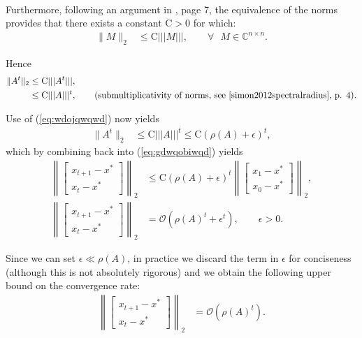 \documentclass{article}
\begin{document}
\\
\par Furthermore, following an argument in \cite{simon2012spectralradius}, page 7, the equivalence of the norms provides that there exists a constant $\text{C}>0$ for which:
\begin{align}
	\| M \|_2 &\le \text{C} ||| M |||, \qquad \forall \text{ }M \in \mathds{C}^{n\times n}. \nonumber
\end{align}
\par Hence
\begin{align}
	\| A^t \|_2	&\le \text{C} ||| A^t |||, \nonumber \\
			&\le \text{C} ||| A |||^t, \qquad \text{(submultiplicativity of norms, see \cite{simon2012spectralradius}, p. 4)}.\nonumber
\end{align}
\par Use of (\ref{eq:wdojqwqwd}) now yields
\begin{align}
	\label{eq:pefnponweffe}
	\| A^t \|_2 &\le \text{C} ||| A |||^t \le \text{C} \left( \rho\left(A\right) + \epsilon \right)^t, \nonumber
\end{align}
which by combining back into (\ref{eq:gdwqobiwqd}) yields
\begin{align}
\left\lVert  \begin{bmatrix}x_{t+1} - x^*\\x_{t} - x^*\end{bmatrix}  \right\rVert_2 &\leq \text{C} \left( \rho\left(A\right) + \epsilon \right)^t  \left\lVert \begin{bmatrix}x_{1}- x^*\\x_{0} - x^*\end{bmatrix}  \right\rVert_2, \nonumber\\
\left\lVert  \begin{bmatrix}x_{t+1} - x^*\\x_{t} - x^*\end{bmatrix}  \right\rVert_2 &= \mathcal{O} \left( \rho\left(A\right)^t + \epsilon^t \right), \qquad \epsilon >0. \nonumber
\end{align}

Since we can set $\epsilon \ll \rho\left( A \right)$, in practice we discard the term in $\epsilon$ for conciseness (although this is not absolutely rigorous) and we obtain the following upper bound on the convergence rate:
\begin{align}
\left\lVert  \begin{bmatrix}x_{t+1} - x^*\\x_{t} - x^*\end{bmatrix}  \right\rVert_2 &= \mathcal{O}  \left( \rho\left(A\right)^t \right). \nonumber
\end{align}
\end{document}
